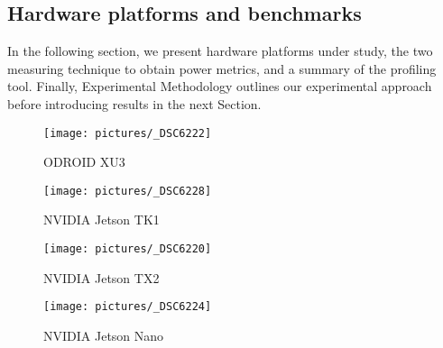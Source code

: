 \subsection{\color{cyan}Hardware platforms and benchmarks}

In the following section, we present hardware platforms under study, the two measuring technique to obtain power metrics, and a summary of the profiling tool. Finally, Experimental Methodology outlines our experimental approach before introducing results in the next Section.

\begin{figure}[t]
  \centering
  \texttt{[image: pictures/\_DSC6222]}
  \caption{ODROID XU3}
  \label{fig:odroid}
\end{figure}

\begin{figure}[t]
  \centering 
  \texttt{[image: pictures/\_DSC6228]}
  \caption{NVIDIA Jetson TK1} 
  \label{fig:tk1}
\end{figure}

\begin{figure}[t]   
  \centering 
  \texttt{[image: pictures/\_DSC6220]}
  \caption{NVIDIA Jetson TX2}   
  \label{fig:tx2}
\end{figure}

\begin{figure}[t]
  \centering 
  \texttt{[image: pictures/\_DSC6224]}
  \caption{NVIDIA Jetson Nano}  
  \label{fig:nano}
\end{figure}


